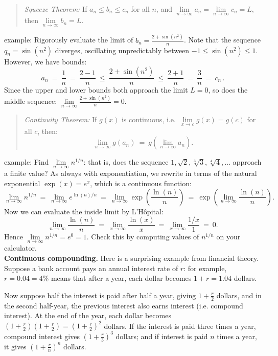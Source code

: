 \documentclass[11pt]{article}
\begin{document}
\begin{quote}
{\it Squeeze Theorem:} If $a_n\leq b_n\leq c_n$ for all $n$, and $\lim\limits_{n\to\infty} a_n = \lim\limits_{n\to\infty} c_n = L$,
then $\lim\limits_{n\to\infty} b_n=L$.
\end{quote}

\noindent
{\sc example:} Rigorously evaluate the limit of $b_n= \frac{2+\sin(n^2)}{n}$.
Note that the sequence $q_n=\sin(n^2)$ diverges, oscillating unpredictably between $-1\leq\sin(n^2)\leq 1$.
However, we have bounds:
$$
a_n\ =\ \frac1n\ =\ \frac{2-1}{n}\ \leq\ \frac{2+\sin(n^2)}{n}\ \leq\ \frac{2+1}{n}\ =\ \frac3n\ =\ c_n\,.
$$
Since the upper and lower bounds both approach the limit $L = 0$, so does the middle sequence: $\lim\limits_{n\to\infty} \frac{2+\sin(n^2)}{n}=0$.

\begin{quote}
{\it Continuity Theorem:} If $g(x)$ is continuous, i.e.~$\lim\limits_{x\to c} g(x)=g(c)$ for all  $c$, 
then:
$$
\lim_{n\to\infty} g(a_n) \ =\ g\!\left(\lim_{n\to\infty} a_n\right).
$$
\end{quote}

\noindent
{\sc example:} Find $\lim\limits_{n\to\infty} n^{1/n}$:
that is, does the sequence $1, \sqrt{2}, \sqrt[3]{3}, \sqrt[4]{4},\ldots$ approach a finite value?
As always with exponentiation, we rewrite in terms of the natural exponential $\exp(x)=e^x$, which is a continuous function:
$$
\lim_{n\to\infty} n^{1/n}
\ =\
\lim_{n\to\infty} e^{\ln(n)/n}
\ =\
\lim_{n\to\infty} \exp\!\left( \frac{\ln(n)}{n} \right)
\ =\
\exp\!\left( \lim_{n\to\infty} \frac{\ln(n)}{n} \right).
$$
Now we can evaluate the inside limit by L'H\^opital:
$$
\lim_{n\to\infty} \frac{\ln(n)}{n}
\ =\
\lim_{x\to\infty} \frac{\ln(x)}{x}
\ =\
\lim_{x\to\infty} \frac{1/x}{1}
\ =\ 0.
$$
Hence $\lim\limits_{n\to\infty} n^{1/n}=e^0 = 1$. 
Check this by computing values of $n^{1/n}$ on your calculator.
\\[1em]
{\bf Continuous compounding.} Here is a surprising example from financial theory.
Suppose a bank account pays an annual interest rate of $r$: for example, $r=0.04=4\%$ means that after a year, each dollar becomes $1+r = 1.04$ dollars.

Now suppose half the interest is paid after half a year, giving $1+\frac r2$ dollars, 
and in the second half-year, the previous interest also earns interest (i.e. compound interest). 
At the end of the year, each dollar becomes 
$(1+\frac r2)(1+\frac r2)=(1+\frac r2)^2$ dollars.
If the interest is paid three times a year, compound interest gives
$(1+\frac r3)^3$ dollars; and if interest is paid $n$ times a year, it gives 
$(1+\frac rn)^n$ dollars.
\end{document}
